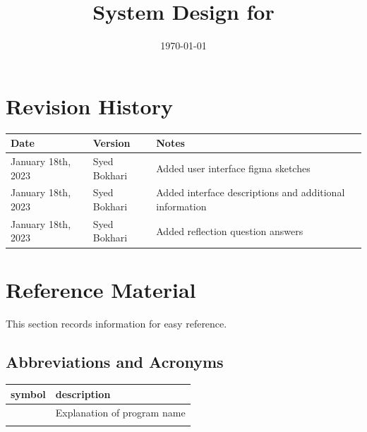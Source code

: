 \documentclass[12pt, titlepage]{article}
\begin{document}
	
	\title{System Design for \progname{}} 
	\author{\authname}
	\date{\today}
	
	\maketitle
	
	
	\section{Revision History}
	
	\begin{tabularx}{\textwidth}{p{3cm}p{2cm}X}
		\toprule {\bf Date} & {\bf Version} & {\bf Notes}\\
		\midrule
		January 18th, 2023 & Syed Bokhari & Added user interface figma sketches\\
		January 18th, 2023 & Syed Bokhari & Added interface descriptions and additional information\\
		January 18th, 2023 & Syed Bokhari & Added reflection question answers\\
		\bottomrule
	\end{tabularx}
	
	\newpage
	
	\section{Reference Material}
	
	This section records information for easy reference.
	
	\subsection{Abbreviations and Acronyms}
	
	\renewcommand{\arraystretch}{1.2}
	\begin{tabular}{l l} 
		\toprule		
		\textbf{symbol} & \textbf{description}\\
		\midrule 
		\progname & Explanation of program name\\
		\wss{...} & \wss{...}\\
		\bottomrule
	\end{tabular}\\
	
	\newpage
	
	\tableofcontents
	
	\newpage
	
	\listoftables
	
\end{document}
